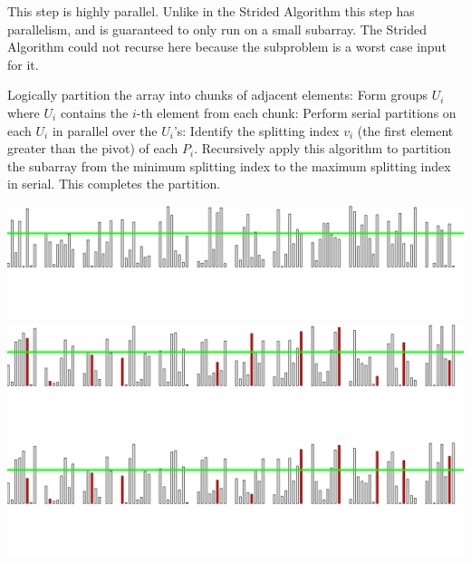 \documentclass[xcolor=x11names, svgnames, rgb]{beamer}
\begin{document}
\begin{frame}[t]{}
\begin{overprint}
	\end{overprint}
	\vspace{0.25cm}
	\begin{overprint}
	This step is highly parallel.
	\onslide<5>Unlike in the Strided Algorithm this step has parallelism, and is guaranteed to only run on a small subarray. The Strided Algorithm could not recurse here because the subproblem is a worst case input for it.
	\end{overprint}
\end{frame}

\begin{frame}[t]{}%
	\vspace{0.25cm}
	\begin{overprint}
	Logically partition the array into chunks of adjacent elements:
	\onslide<2>Form groups $U_i$ where $U_i$ contains the $i$-th element from each chunk:
	\onslide<3>Perform serial partitions on each $U_i$ in parallel over the $U_i$'s:
	\onslide<4>Identify the splitting index $v_i$ (the first element greater than the pivot) of each $P_i$. 
	\onslide<5>Recursively apply this algorithm to partition the subarray from the minimum splitting index to the maximum splitting index in serial. This completes the partition. 
	\end{overprint}
	\vspace{0.25cm}
	\begin{overprint}
	\includegraphics[width=\linewidth]{imgs/smoothedAlgSim/smoothedAlgSim_1.png}
	\onslide<2>\includegraphics[width=\linewidth]{imgs/smoothedAlgSim/smoothedAlgSim_2.png}
	\onslide<3>\includegraphics[width=\linewidth]{imgs/smoothedAlgSim/smoothedAlgSim_3.png}

\end{overprint}
\end{frame}
\end{document}
